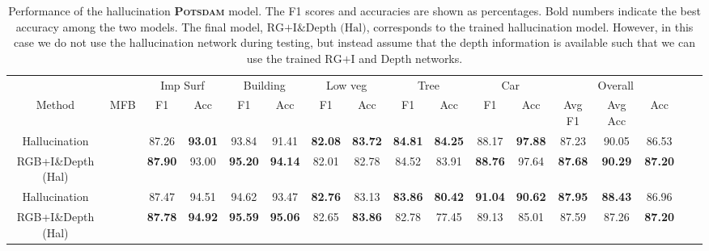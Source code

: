 \documentclass[journal]{IEEEtran}
\newcommand{\cmark}{\ding{51}}%
\newcommand{\xmark}{\ding{55}}%
\begin{document}
\begin{table*}[t]
\begin{center}
\begin{tabular}{lc|c|c|c|c|c|c|c|c|c|c|c|c|c|c|c|}
\cline{3-15}
& & \multicolumn{2}{|c|}{Imp Surf} & \multicolumn{2}{c|}{Building} & \multicolumn{2}{c|}{Low veg} & \multicolumn{2}{c|}{Tree} & \multicolumn{2}{c|}{Car} & \multicolumn{3}{c|}{Overall}\\
\cline{1-15}
\multicolumn{1}{|c|}{Method} & \multicolumn{1}{|c|}{MFB} & F1 & Acc & F1 & Acc & F1 & Acc & F1 & Acc & F1 & Acc & Avg F1 & Avg Acc & Acc\\
\hline\hline
\multicolumn{1}{|c|}{Hallucination} & \cmark & 87.26 & {\bf93.01} & 93.84 & 91.41 & {\bf82.08} & {\bf83.72} & {\bf84.81} & {\bf84.25} & 88.17 & {\bf97.88} & 87.23 & 90.05 & 86.53\\
\hline
\multicolumn{1}{|c|}{RGB+I\&Depth (Hal)} & \cmark & {\bf87.90} & 93.00 & {\bf95.20} & {\bf94.14} & 82.01 & 82.78 & 84.52 & 83.91 & {\bf88.76} & 97.64 & {\bf87.68} & {\bf90.29} & {\bf87.20} \\
\hline
\hline
\multicolumn{1}{|c|}{Hallucination} & \xmark & 87.47 & 94.51 & 94.62 & 93.47 & {\bf82.76} & 83.13 & {\bf83.86} & {\bf80.42} & {\bf91.04} & {\bf90.62} & {\bf87.95} & {\bf88.43} & 86.96\\
\hline
\multicolumn{1}{|c|}{RGB+I\&Depth (Hal)} & \xmark & {\bf87.78} & {\bf94.92} & {\bf95.59} & {\bf95.06} & 82.65 & {\bf83.86} & 82.78 & 77.45 & 89.13 & 85.01 & 87.59 & 87.26 & {\bf87.20} \\
\hline
\end{tabular}
\vspace{0.2cm}
\caption{Performance of the hallucination {\bf\scshape Potsdam} model. The F1 scores and accuracies are shown as percentages. Bold numbers indicate the best accuracy among the two models. The final model, $\text{RG+I\&Depth (Hal)}$, corresponds to the trained hallucination model. However, in this case we do not use the hallucination network during testing, but instead assume that the depth information is available such that we can use the trained $\text{RG+I}$ and $\text{Depth}$ networks.}
\label{tab:resultsHallucinationPotsdam}
\end{center}
\end{table*}
\end{document}
